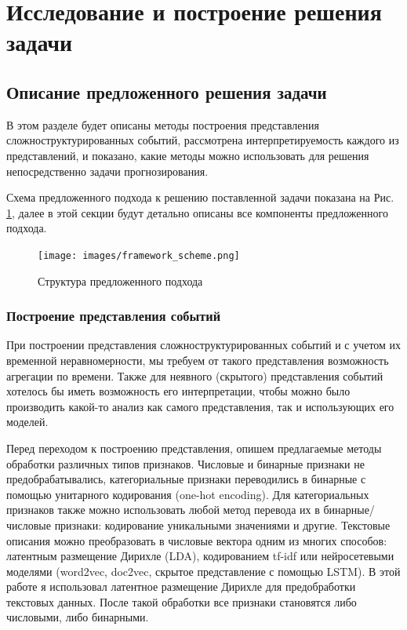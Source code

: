 \section{Исследование и построение решения задачи}
\label{sec:research_and_solving} 
\subsection{Описание предложенного решения задачи}
В этом разделе будет описаны методы построения представления сложноструктурированных событий, рассмотрена интерпретируемость каждого из представлений, и показано, какие методы можно использовать для решения  непосредственно задачи прогнозирования.

Схема предложенного подхода к решению поставленной задачи показана на Рис. \ref{fig:framework_structure}, далее в этой секции будут детально описаны все компоненты предложенного подхода.

\begin{figure}
    \centering
    \texttt{[image: images/framework\_scheme.png]}
    \caption{Структура предложенного подхода}
    \label{fig:framework_structure}
\end{figure}

\subsubsection{Построение представления событий}
\label{subsub:repr}
При построении представления сложноструктурированных событий и с учетом их временной неравномерности,
мы требуем от такого представления возможность агрегации по времени. Также для неявного (скрытого) представления событий хотелось бы иметь возможность его интерпретации, чтобы можно было производить какой-то анализ как самого представления, так и использующих его моделей.

Перед переходом к построению представления, опишем предлагаемые методы обработки различных типов признаков.
Числовые и бинарные признаки не предобрабатывались, категориальные признаки переводились в бинарные с помощью унитарного кодирования (one-hot encoding). Для категориальных признаков также можно использовать любой метод перевода их в бинарные/числовые признаки: кодирование уникальными значениями и другие.
Текстовые описания можно преобразовать в числовые вектора одним из многих способов: латентным размещение Дирихле (LDA), кодированием tf-idf или нейросетевыми моделями (word2vec, doc2vec, скрытое представление с помощью LSTM). В этой работе я использовал латентное размещение Дирихле для предобработки текстовых данных. После такой обработки все признаки становятся либо числовыми, либо бинарными.

